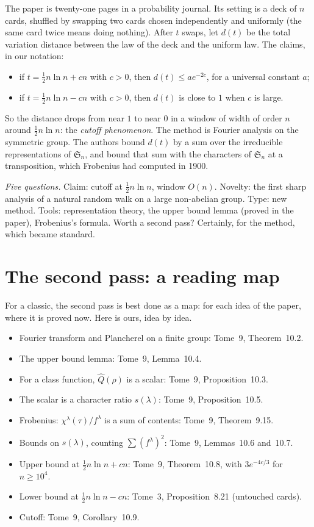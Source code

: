 The paper is twenty-one pages in a probability journal. Its setting is a deck of $n$ cards, shuffled by swapping two cards chosen independently and
uniformly (the same card twice means doing nothing). After $t$ swaps, let $d(t)$ be the total variation distance between the law of the deck and
the uniform law. The claims, in our notation:
\begin{itemize}
\item if $t=\frac12n\ln n+cn$ with $c>0$, then $d(t)\le ae^{-2c}$, for a universal constant $a$;
\item if $t=\frac12n\ln n-cn$ with $c>0$, then $d(t)$ is close to $1$ when $c$ is large.
\end{itemize}
So the distance drops from near $1$ to near $0$ in a window of width of order $n$ around $\frac12n\ln n$: the \emph{cutoff phenomenon}. The method is
Fourier analysis on the symmetric group. The authors bound $d(t)$ by a sum over the irreducible
representations of $\mathfrak S_n$, and bound that sum with the characters of $\mathfrak S_n$ at a transposition, which Frobenius had computed in 1900.

\emph{Five questions.} Claim: cutoff at $\frac12n\ln n$, window $O(n)$. Novelty: the first sharp analysis of a natural random walk on a large
non-abelian group. Type: new method. Tools: representation theory, the upper bound lemma (proved in the paper), Frobenius's formula. Worth a second
pass? Certainly, for the method, which became standard.

\section{The second pass: a reading map}

For a classic, the second pass is best done as a map: for each idea of the paper, where it is proved now. Here is ours, idea by idea.

\begin{itemize}
\item Fourier transform and Plancherel on a finite group: Tome~9, Theorem~10.2.
\item The upper bound lemma: Tome~9, Lemma~10.4.
\item For a class function, $\hat Q(\rho)$ is a scalar: Tome~9, Proposition~10.3.
\item The scalar is a character ratio $s(\lambda)$: Tome~9, Proposition~10.5.
\item Frobenius: $\chi^\lambda(\tau)/f^\lambda$ is a sum of contents: Tome~9, Theorem~9.15.
\item Bounds on $s(\lambda)$, counting $\sum(f^\lambda)^2$: Tome~9, Lemmas~10.6 and~10.7.
\item Upper bound at $\frac12n\ln n+cn$: Tome~9, Theorem~10.8, with $3e^{-4c/3}$ for $n\ge10^4$.
\item Lower bound at $\frac12n\ln n-cn$: Tome~3, Proposition~8.21 (untouched cards).
\item Cutoff: Tome~9, Corollary~10.9.
\end{itemize}

